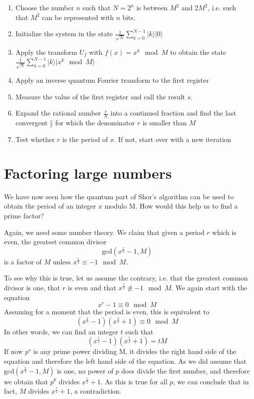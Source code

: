 \documentclass[a4paper, draft]{article}
\theoremstyle{own}
\theoremstyle{remark}
\begin{document}
\begin{enumerate}
	\item Choose the number $n$ such that $N=2^n$ is between $M^2$ and $2M^2$, i.e. such that $M^2$ can be represented with $n$ bits.
	\item Initialize the system in the state $\frac{1}{\sqrt{N}} \sum_{k=0}^{N-1} |k \rangle  |0\rangle$
	\item Apply the transform $U_f$ with $f(x) = x^k \mod M$ to obtain the state
	$\frac{1}{\sqrt{N}} \sum_{k=0}^{N-1} |k \rangle  |x^k \mod M \rangle$
	\item Apply an inverse quantum Fourier transform to the first register
	\item Measure the value of the first register and call the result $s$.
	\item Expand the rational number $\frac{r}{N}$ into a continued fraction and find the last convergent $\frac{c}{r}$ for which the denominator $r$ is smaller than $M$
	\item Test whether $r$ is the period of $x$. If not, start over with a new iteration 
\end{enumerate}




\section{Factoring large numbers}

We have now seen how the quantum part of Shor's algorithm can be used to obtain the period of an integer $x$ modulo M. How would this help us to find a prime factor?

Again, we need some number theory. We claim that given a period $r$ which is even, the greatest common divisor 
$$
\text{gcd}(x^{\frac{r}{2}} - 1, M)
$$
is a factor of $M$ unless $x^{\frac{r}{2}} \equiv - 1 \mod M$. 

To see why this is true, let us assume the contrary, i.e. that the greatest common divisor is one, that $r$ is even and that $x^{\frac{r}{2}} \not\equiv - 1 \mod M$. We again start with the equation
$$
x^r - 1 \equiv 0 \mod M
$$
Assuming for a moment that the period is even, this is equivalent to 
$$
(x^{\frac{r}{2}} - 1) (x^{\frac{r}{2}} + 1) \equiv 0 \mod M
$$
In other words, we can find an integer $t$ such that
$$
(x^{\frac{r}{2}} - 1) (x^{\frac{r}{2}} + 1) = tM
$$
If now $p^s$ is any prime power dividing M, it divides the right hand side of the equation and therefore the left hand side of the equation. As we did assume that  $\text{gcd}(x^{\frac{r}{2}} - 1, M)$ is one, no power of $p$ does divide the first number, and therefore we obtain that $p^k$ divides $x^{\frac{r}{2}} + 1$. As this is true for all $p$, we can conclude that in fact, $M$ divides $x^{\frac{r}{2}} + 1$, a contradiction. 
\end{document}

